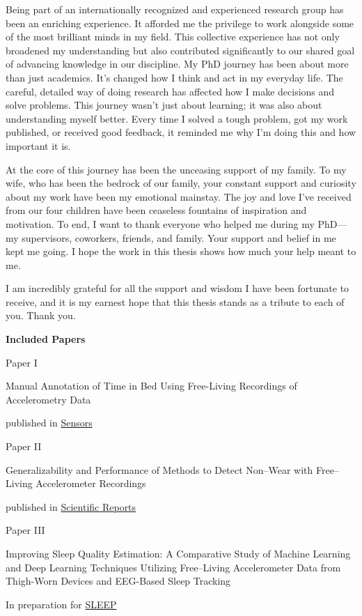 \documentclass[
  10pt,
]{scrbook}
\let\originaltextbf\textbf
\renewcommand{\textbf}[1]{\textcolor{color1}{\textsf{\originaltextbf{#1}}}}
\newcommand{\aftertocpagenum}{
   \cleardoublepage
   \pagenumbering{arabic}
 }
\renewcommand*\contentsname{Table of contents}
\newcommand\contentsname{Table of contents}
\begin{document}
Being part of an internationally recognized and experienced research group has been an enriching experience. It afforded me the privilege to work alongside some of the most brilliant minds in my field. This collective experience has not only broadened my understanding but also contributed significantly to our shared goal of advancing knowledge in our discipline.
My PhD journey has been about more than just academics. It's changed how I think and act in my everyday life. The careful, detailed way of doing research has affected how I make decisions and solve problems. This journey wasn't just about learning; it was also about understanding myself better. Every time I solved a tough problem, got my work published, or received good feedback, it reminded me why I'm doing this and how important it is.

At the core of this journey has been the unceasing support of my family. To my wife, who has been the bedrock of our family, your constant support and curiosity about my work have been my emotional mainstay. The joy and love I've received from our four children have been ceaseless fountains of inspiration and motivation.
To end, I want to thank everyone who helped me during my PhD—my supervisors, coworkers, friends, and family. Your support and belief in me kept me going. I hope the work in this thesis shows how much your help meant to me.

I am incredibly grateful for all the support and wisdom I have been fortunate to receive, and it is my earnest hope that this thesis stands as a tribute to each of you. Thank you.

\newpage

\textcolor{color1}{\textsf{\textbf{\Large{Included Papers}}}}

\vspace{2cm}

\begin{center}

Paper I

\textsf{Manual Annotation of Time in Bed Using Free-Living Recordings of Accelerometry Data}

published in \href{https://doi.org/10.3390/s21248442}{Sensors}

\vspace{2cm}
Paper II

\textsf{Generalizability and Performance of Methods to Detect Non–Wear with Free–Living Accelerometer Recordings}

published in \href{https://doi.org/10.1038/s41598-023-29666-x}{Scientific Reports}

\vspace{2cm}
Paper III 

\textsf{Improving Sleep Quality Estimation: A Comparative Study of Machine Learning and Deep Learning Techniques Utilizing Free–Living Accelerometer Data from Thigh-Worn Devices and EEG-Based Sleep Tracking}

In preparation for \href{https://academic.oup.com/sleep}{SLEEP}

\end{center}\renewcommand*\contentsname{Table of contents}
{
\hypersetup{linkcolor=}
\setcounter{tocdepth}{2}
\tableofcontents
}
\listoffigures
\listoftables
\mainmatter
\aftertocpagenum
\end{document}
